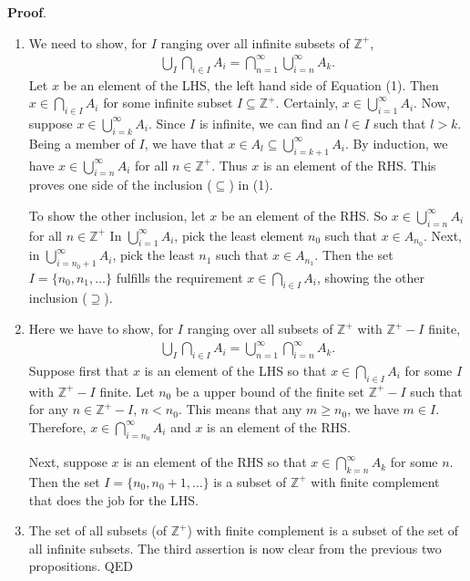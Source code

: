 \documentclass[12pt]{article}
\begin{document}
\textbf{Proof}. \begin{enumerate}
\item We need to show, for $I$ ranging over all infinite subsets of
$\mathbb{Z}^{+}$,
\begin{eqnarray}
\bigcup_{I}\bigcap_{i\in I} A_i=\bigcap_{n=1}^\infty
\bigcup_{i=n}^\infty A_k.\end{eqnarray} Let $x$ be an element of the
LHS, the left hand side of Equation (1). Then $x\in\bigcap_{i\in I}
A_i$ for some infinite subset $I\subseteq\mathbb{Z}^{+}$. Certainly,
$x\in\bigcup_{i=1}^{\infty} A_i$.  Now, suppose
$x\in\bigcup_{i=k}^{\infty} A_i$.  Since $I$ is infinite, we can
find an $l\in I$ such that $l>k$.  Being a member of $I$, we have
that $x\in A_l\subseteq\bigcup_{i=k+1}^{\infty} A_i$.  By induction,
we have $x\in\bigcup_{i=n}^{\infty} A_i$ for all
$n\in\mathbb{Z}^{+}$.  Thus $x$ is an element of the RHS. This
proves one side of the inclusion ($\subseteq$) in (1).

To show the other inclusion, let $x$ be an element of the RHS.  So
$x\in\bigcup_{i=n}^{\infty} A_i$ for all $n\in\mathbb{Z}^{+}$  In
$\bigcup_{i=1}^{\infty} A_i$, pick the least element $n_0$ such that
$x\in A_{n_0}$.  Next, in $\bigcup_{i=n_0+1}^{\infty} A_i$, pick the
least $n_1$ such that $x\in A_{n_1}$.  Then the set $I=\lbrace
n_0,n_1,\ldots \rbrace$ fulfills the requirement $x\in\bigcap_{i\in
I} A_i$, showing the other inclusion ($\supseteq$).
\item  Here we have to show, for $I$ ranging over all subsets of
$\mathbb{Z}^{+}$ with $\mathbb{Z}^{+}-I$ finite,
\begin{eqnarray}
\bigcup_{I}\bigcap_{i\in I} A_i=\bigcup_{n=1}^\infty
\bigcap_{i=n}^\infty A_k.\end{eqnarray}  Suppose first that $x$ is
an element of the LHS so that $x\in\bigcap_{i\in I} A_i$ for some
$I$ with $\mathbb{Z}^{+}-I$ finite.  Let $n_0$ be a upper bound of
the finite set $\mathbb{Z}^{+}-I$ such that for any
$n\in\mathbb{Z}^{+}-I$, $n<n_0$.  This means that any $m\geq n_0$,
we have $m\in I$. Therefore, $x\in\bigcap_{i=n_0}^{\infty} A_i$ and
$x$ is an element of the RHS.

Next, suppose $x$ is an element of the RHS so that
$x\in\bigcap_{k=n}^\infty A_k$ for some $n$.  Then the set
$I=\lbrace n_0,n_0+1,\ldots\rbrace$ is a subset of $\mathbb{Z}^{+}$
with finite complement that does the job for the LHS.
\item  The set of all subsets (of $\mathbb{Z}^{+}$) with finite
complement is a subset of the set of all infinite subsets.  The
third assertion is now clear from the previous two propositions. QED
\end{enumerate}
\end{document}
